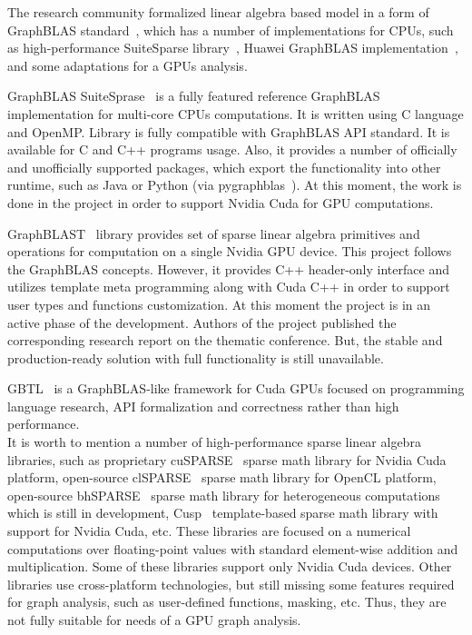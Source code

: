 The research community formalized linear algebra based model in a form of GraphBLAS standard~\cite{paper:graphblas_foundations}, which has a number of implementations for CPUs, such as high-performance SuiteSparse library~\cite{article:suite_sparse_for_graph_problems}, Huawei GraphBLAS implementation~\cite{article:hu_graphblas_impl}, and some adaptations for a GPUs analysis. 

GraphBLAS SuiteSprase~\cite{article:suite_sparse_for_graph_problems} is a fully featured reference GraphBLAS implementation for multi-core CPUs computations. It is written using C language and OpenMP. Library is fully compatible with GraphBLAS API standard. It is available for C and C++ programs usage. Also, it provides a number of officially and unofficially supported packages, which export the functionality into other runtime, such as Java or Python (via pygraphblas~\cite{net:pygraphblas}). At this moment, the work is done in the project in order to support Nvidia Cuda for GPU computations.

GraphBLAST~\cite{yang2019graphblast} library provides set of sparse linear algebra primitives and operations for computation on a single Nvidia GPU device. This project follows the GraphBLAS concepts. However, it provides C++ header-only interface and utilizes template meta programming along with Cuda C++ in order to support user types and functions customization. At this moment the project is in an active phase of the development. Authors of the project published the corresponding research report on the thematic conference. But, the stable and production-ready solution with full functionality is still unavailable.

GBTL~\cite{article:gbtl} is a GraphBLAS-like framework for Cuda GPUs focused on programming language research, API formalization and correctness rather than high performance.\\

It is worth to mention a number of high-performance sparse linear algebra libraries, such as proprietary cuSPARSE~\cite{net:cusparse_docs} sparse math library for Nvidia Cuda platform, open-source clSPARSE~\cite{article:clsparse} sparse math library for OpenCL platform, open-source bhSPARSE~\cite{article:bhsparse} sparse math library for heterogeneous computations which is still in development, Cusp~\cite{net:cusplibrary} template-based sparse math library with support for Nvidia Cuda, etc. These libraries are focused on a numerical computations over floating-point values with standard element-wise addition and multiplication. Some of these libraries support only Nvidia Cuda devices. Other libraries use cross-platform technologies, but still missing some features required for graph analysis, such as user-defined functions, masking, etc. Thus, they are not fully suitable for needs of a GPU graph analysis.

